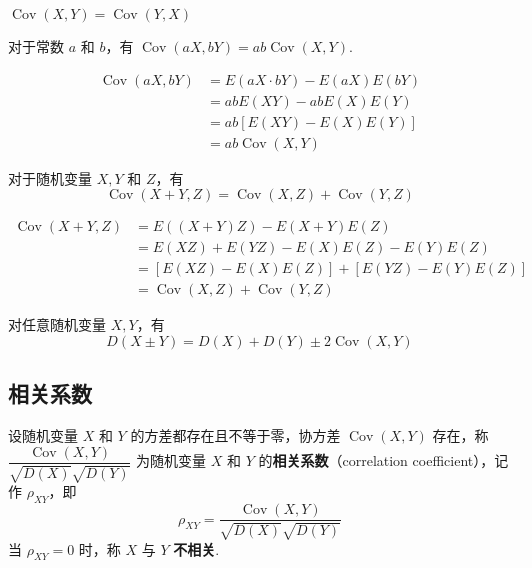 \setcounter{propertyname}{0}

\begin{property}
    $\operatorname{Cov}(X,Y) = \operatorname{Cov}(Y,X)$
\end{property}

\begin{property}
    对于常数 $a$ 和 $b$，有 $\operatorname{Cov}(aX,bY) = ab \operatorname{Cov}(X,Y)$.
\end{property}

\begin{myproof}
    $$
    \begin{aligned}
        \operatorname{Cov}(aX,bY) &= E(aX \cdot bY) - E(aX) E(bY) \\
        &= ab E(XY) - ab E(X) E(Y) \\
        &= ab[E(XY) - E(X) E(Y)] \\
        &= ab \operatorname{Cov}(X,Y)
    \end{aligned}
    $$
\end{myproof}

\begin{property}
    对于随机变量 $X,Y$ 和 $Z$，有
    $$
    \operatorname{Cov}(X+Y,Z) = \operatorname{Cov}(X,Z) + \operatorname{Cov}(Y,Z)
    $$
\end{property}

\begin{myproof}
    $$
    \begin{aligned}
        \operatorname{Cov}(X+Y,Z) &= E((X+Y)Z) - E(X+Y) E(Z) \\
        &= E(XZ) + E(YZ) - E(X) E(Z) - E(Y) E(Z) \\
        &= [E(XZ) - E(X) E(Z)] + [E(YZ) - E(Y) E(Z)] \\
        &= \operatorname{Cov}(X,Z) + \operatorname{Cov}(Y,Z)
    \end{aligned}
    $$
\end{myproof}

\begin{property}
    对任意随机变量 $X,Y$，有
    $$
    D(X \pm Y) = D(X) + D(Y) \pm 2 \operatorname{Cov}(X,Y)
    $$
\end{property}

\subsection{相关系数}

\begin{definition}
    设随机变量 $X$ 和 $Y$ 的方差都存在且不等于零，协方差 $\operatorname{Cov}(X,Y)$ 存在，称 $\dfrac{\operatorname{Cov}(X,Y)}{\sqrt{D(X)} \sqrt{D(Y)}}$ 为随机变量 $X$ 和 $Y$ 的\textbf{相关系数}（correlation coefficient），记作 $\rho_{XY}$，即
    $$
    \rho_{XY} = \dfrac{\operatorname{Cov}(X,Y)}{\sqrt{D(X)} \sqrt{D(Y)}}
    $$
    当 $\rho_{XY} = 0$ 时，称 $X$ 与 $Y$ \textbf{不相关}.
\end{definition}

